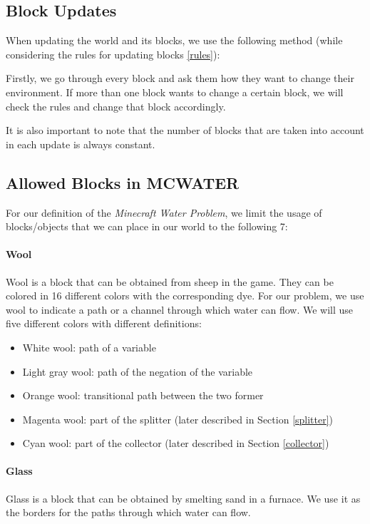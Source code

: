 \subsection{Block Updates} \label{blockupdates}

\noindent When updating the world and its blocks, we use the following method (while considering the rules for updating blocks \ref{rules}):

\noindent Firstly, we go through every block and ask them how they want to change their environment. If more than one block wants to change a certain block, we will check the rules and change that block accordingly. 

\noindent It is also important to note that the number of blocks that are taken into account in each update is always constant.

\pagebreak
\subsection{Allowed Blocks in MCWATER} \label{blocks}

\noindent For our definition of the \textit{Minecraft Water Problem}, we limit the usage of blocks/objects that we can place in our world to the following 7:
\paragraph{Wool\cite{minecraftfandom:wool}}
Wool is a block that can be obtained from sheep in the game.
They can be colored in 16 different colors with the corresponding dye.
For our problem, we use wool to indicate a path or a channel through which water can flow.
We will use five different colors with different definitions:
\begin{itemize}
    \item White wool: path of a variable
    \item Light gray wool: path of the negation of the variable
    \item Orange wool: transitional path between the two former
    \item Magenta wool: part of the splitter (later described in Section \ref{splitter})
    \item Cyan wool: part of the collector (later described in Section \ref{collector})
\end{itemize}

\paragraph{Glass\cite{minecraftfandom:glass}}
Glass is a block that can be obtained by smelting sand in a furnace.
We use it as the borders for the paths through which water can flow.

